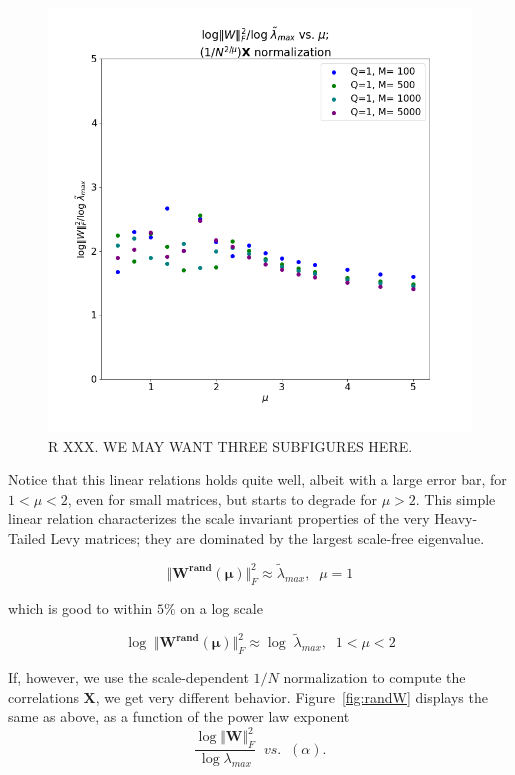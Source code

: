 \begin{figure}[!htb]
 \centering
   \includegraphics[scale=0.40]{img/LogNorm-Lmax-Scaled.png}
   \caption{R XXX.  WE MAY WANT THREE SUBFIGURES HERE.}
  \label{fig:logNormHat}
\end{figure}


Notice that this linear relations holds quite well, albeit with a large error bar, for $1<\mu<2$, even for small matrices, but starts to degrade for $\mu>2$.
This simple linear relation characterizes the scale invariant properties of the very Heavy-Tailed Levy matrices; they are dominated by the largest scale-free eigenvalue.

$$\Vert\mathbf{W^{rand}(\mu)}\Vert^{2}_{F}\approx\tilde{\lambda}_{max},\;\;\mu=1$$


which is good to within $5\%$ on a log scale

$$\log\;\Vert\mathbf{W^{rand}(\mu)}\Vert^{2}_{F}\approx\log\;\tilde{\lambda}_{max},\;\;1<\mu<2$$


If, however, we use the scale-dependent $1/N$ normalization to compute the correlations $\mathbf{X}$, we get very different behavior.
Figure~\ref{fig:randW} displays the same as above, as a function of the power law exponent 
$$
\dfrac{\log\Vert\mathbf{W}\Vert^{2}_{F}}{\log\lambda_{max}}\;\;vs.\;\;(\alpha)  .
$$

